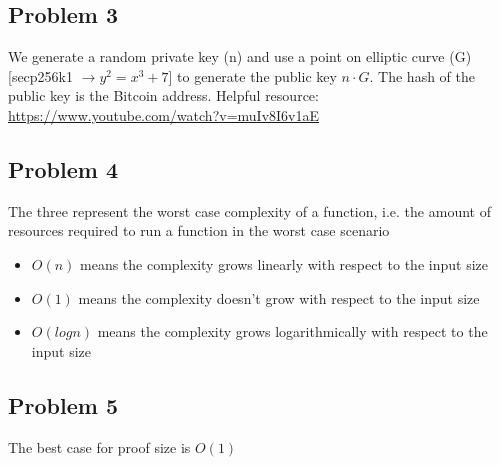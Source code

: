 \documentclass{article}
\begin{document}
\subsection*{Problem 3}
We generate a random private key (n) and use a point on elliptic curve (G) [secp256k1 $\rightarrow y^2 = x^3 + 7$] to generate the public key $n \cdot G$. The hash of the public key is the Bitcoin address. Helpful resource: \href{https://www.youtube.com/watch?v=muIv8I6v1aE}{https://www.youtube.com/watch?v=muIv8I6v1aE}

\subsection*{Problem 4}
The three represent the worst case complexity of a function, i.e. the amount of resources required to run a function in the worst case scenario
\begin{itemize}
\item $O(n)$ means the complexity grows linearly with respect to the input size
\item $O(1)$ means the complexity doesn't grow with respect to the input size
\item $O(log n)$ means the complexity grows logarithmically with respect to the input size 
\end{itemize}

\subsection*{Problem 5}
The best case for proof size is $O(1)$ 

\clearpage %
\end{document}
